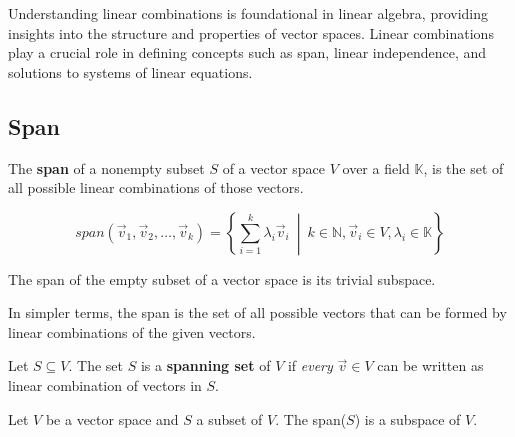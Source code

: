 Understanding linear combinations is foundational in linear algebra, providing insights into the structure and properties of vector spaces. Linear combinations play a crucial role in defining concepts such as span, linear independence, and solutions to systems of linear equations.
\subsection{Span}

\begin{tcolorbox}[colback=def_color,colframe=gray] \begin{definition}
    The \textbf{span} of a nonempty subset $S$ of a vector space $V$ over a field $\mathbb K$, is the set of all possible linear combinations of those vectors.

$$
\textit{span}(\vec{v}_1, \vec{v}_2, \ldots, \vec{v}_k) = \left\{ \sum_{i=1}^k \lambda_i \vec{v}_i \ \middle| \ k \in \mathbb{N}, \vec{v}_i \in V, \lambda_i \in \mathbb K \right\}
$$

The span of the empty subset of a vector space is its trivial subspace.

\label{def:trivial-vectorspace}
\end{definition}
\end{tcolorbox}

In simpler terms, the span is the set of all possible vectors that can be formed by linear combinations of the given vectors.

\begin{tcolorbox}[colback=def_color,colframe=gray] \begin{definition}
    Let $S \subseteq V$. The set $S$ is a \textbf{spanning set} of $V$ if \textit{every} $\vec v \in V$ can be written as linear combination of vectors in $S$.
\end{definition}
\end{tcolorbox}

\begin{tcolorbox}[colback=def_color,colframe=gray,coltext=black] \begin{lemma}
    Let $V$ be a vector space and $S$ a subset of $V$. The {\normalfont span($S$)} is a subspace of $V$.
\end{lemma}
\end{tcolorbox}

